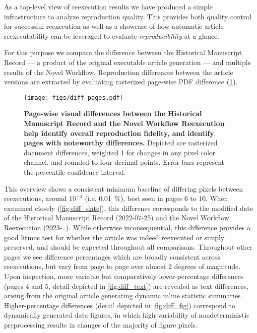 As a top-level view of reexecution results we have produced a simple infrastructure to analyze reproduction quality.
This provides both quality control for successful reexecution as well as a showcase of how automatic article reexecutability can be leveraged to evaluate \textit{reproducibility} at a glance.

For this purpose we compare the difference between the Historical Manuscript Record — a product of the original executable article generation — and multiple results of the Novel Workflow.
Reproduction differences between the article versions are extracted by evaluating rasterized page-wise PDF difference (\ref{fig:diff_pages}).

\begin{figure}
	\centering
	\texttt{[image: figs/diff\_pages.pdf]}
	\caption{
		\textbf{Page-wise visual differences between the Historical Manuscript Record and the Novel Workflow Reexecution help identify overall reproduction fidelity, and identify pages with noteworthy differences.}
		Depicted are rasterized document differences, weighted 1 for changes in any pixel color channel, and rounded to four decimal points.
		Error bars represent the  percentile confidence interval.
	}
	\label{fig:diff_pages}
\end{figure}

This overview shows a consistent minimum baseline of differing pixels between reexecutions, around $10^{-4}$ (i.e. \SI{0.01}{\percent}), best seen in pages 6 to 10.
When examined closely (\ref{fig:diff_date}), this difference corresponds to the modified date of the Historical Manuscript Record (2022-07-25) and the Novel Workflow Reexecution (2023-..).
While otherwise inconsequential, this difference provides a good litmus test for whether the article was indeed reexecuted or simply preserved, and should be expected throughout all comparisons.
Throughout other pages we see difference percentages which are broadly consistent across reexecutions, but vary from page to page over almost 2 degrees of magnitude.
Upon inspection, more variable but comparatively lower-percentage differences (pages 4 and 5, detail depicted in \cref{fig:diff_text}) are revealed as text differences, arising from the original article generating dynamic inline statistic summaries.
Higher-percentage differences (detail depicted in \cref{fig:diff_fig}) correspond to dynamically generated data figures, in which high variability of nondeterministic preprocessing results in changes of the majority of figure pixels.

